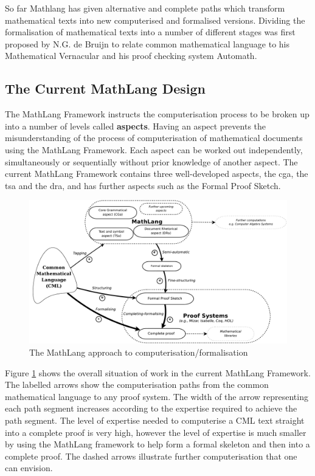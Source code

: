 So far Mathlang has given alternative and complete paths which transform mathematical texts into new computerised and formalised versions. Dividing the formalisation of mathematical texts into a number of different stages was first proposed by N.G. de Bruijn to relate common mathematical language to his Mathematical Vernacular \cite{mv} and his proof checking system Automath.

\subsection{The Current MathLang Design \label{sec:currentmath}}
The MathLang Framework instructs the computerisation process to be broken up into a number of levels called \textbf{aspects}. Having an aspect prevents the misunderstanding of the process of computerisation of mathematical documents using the MathLang Framework. Each aspect can be worked out independently, simultaneously or sequentially without prior knowledge of another aspect. The current MathLang Framework contains three well-developed aspects, the \gls{cga}, the \gls{tsa} and the \gls{dra}, and has further aspects such as the Formal Proof Sketch.

\begin{figure}[H]
\begin{center}
\includegraphics[scale=0.255]{Figures/Background/mathlang.png}
\end{center}
\caption{The MathLang approach to computerisation/formalisation \cite{mathintomizar}\label{fig:mathlang}}
\end{figure}

Figure \ref{fig:mathlang} shows the overall situation of work in the current MathLang Framework.
The labelled arrows show the computerisation paths from the common mathematical language to any proof system. The width of the arrow representing each path segment increases according to the expertise required to achieve the path segment. The level of expertise needed to computerise a CML text straight into a complete proof is very high, however the level of expertise is much smaller by using the MathLang framework to help form a formal skeleton and then into a complete proof. The dashed arrows illustrate further computerisation that one can envision.

